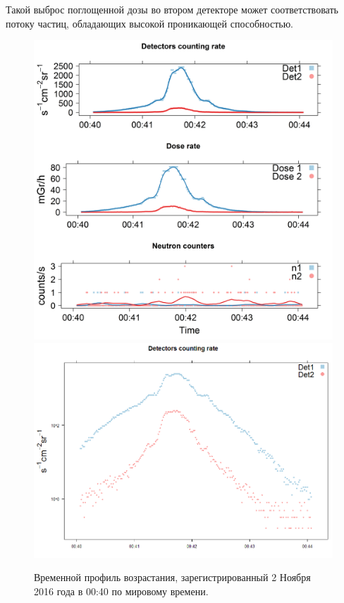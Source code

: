 Такой выброс поглощенной дозы во втором детекторе может соответствовать потоку частиц, обладающих высокой проникающей способностью.
\begin{figure}
	\centering
	\includegraphics[width=0.49\linewidth]{images/Flash/depron_sec_log_new11-02-16}
	\includegraphics[width=0.49\linewidth]{images/Flash/depron_sec_log_new11-02-161}
	\caption{Временной профиль возрастания, зарегистрированный 2 Ноября 2016 года в 00:40 по мировому времени.}
	\label{fig:depronseclognew11-02-16}
\end{figure}





